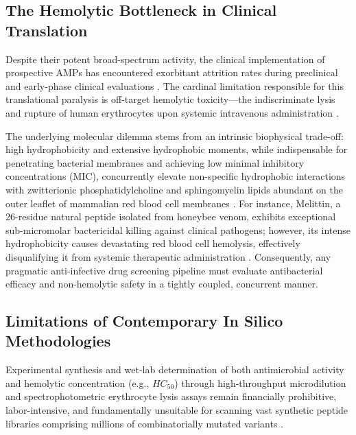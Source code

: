 \documentclass[11pt,a4paper]{article}
\begin{document}
\subsection{The Hemolytic Bottleneck in Clinical Translation}
Despite their potent broad-spectrum activity, the clinical implementation of prospective AMPs has encountered exorbitant attrition rates during preclinical and early-phase clinical evaluations \cite{marr2006antibacterial, mahlapuu2016antimicrobial}. The cardinal limitation responsible for this translational paralysis is off-target hemolytic toxicity---the indiscriminate lysis and rupture of human erythrocytes upon systemic intravenous administration \cite{chaudhary2016hemopi, plisson2020happenn}. 

The underlying molecular dilemma stems from an intrinsic biophysical trade-off: high hydrophobicity and extensive hydrophobic moments, while indispensable for penetrating bacterial membranes and achieving low minimal inhibitory concentrations (MIC), concurrently elevate non-specific hydrophobic interactions with zwitterionic phosphatidylcholine and sphingomyelin lipids abundant on the outer leaflet of mammalian red blood cell membranes \cite{eisenberg1982helical, blondelle1991hemolytic}. For instance, Melittin, a 26-residue natural peptide isolated from honeybee venom, exhibits exceptional sub-micromolar bactericidal killing against clinical pathogens; however, its intense hydrophobicity causes devastating red blood cell hemolysis, effectively disqualifying it from systemic therapeutic administration \cite{raghuraman2007melittin, oren1997selective}. Consequently, any pragmatic anti-infective drug screening pipeline must evaluate antibacterial efficacy and non-hemolytic safety in a tightly coupled, concurrent manner.

\subsection{Limitations of Contemporary In Silico Methodologies}
Experimental synthesis and wet-lab determination of both antimicrobial activity and hemolytic concentration (e.g., $HC_{50}$) through high-throughput microdilution and spectrophotometric erythrocyte lysis assays remain financially prohibitive, labor-intensive, and fundamentally unsuitable for scanning vast synthetic peptide libraries comprising millions of combinatorially mutated variants \cite{sidorczuk2022benchmarking, capecchi2021machine}. 
\end{document}
